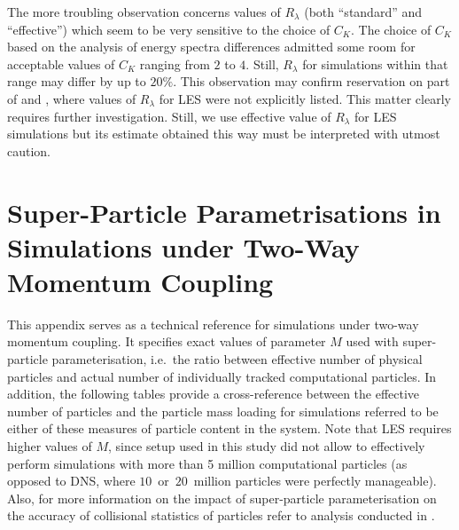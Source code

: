 \documentclass{pracamgren}
\begin{document}
The more troubling observation concerns values of $R_{\lambda}$ (both ``standard'' and ``effective'') which seem to be very sensitive to the choice of $C_K$.
The choice of $C_K$ based on the analysis of energy spectra differences admitted some room for acceptable values of $C_K$ ranging from $2$ to $4$.
Still, $R_{\lambda}$ for simulations within that range may differ by up to $20\%$.
This observation may confirm reservation on part of \textcite{Yang2008} and \textcite{Jin2010}, where values of $R_{\lambda}$ for LES were not explicitly listed.
This matter clearly requires further investigation.
Still, we use effective value of $R_{\lambda}$ for LES simulations but its estimate obtained this way must be interpreted with utmost caution.  



\chapter{Super-Particle Parametrisations in Simulations under Two-Way Momentum Coupling}
\label{app:spp}

This appendix serves as a technical reference for simulations under two-way momentum coupling.
It specifies exact values of parameter $M$ used with super-particle parameterisation, i.e.~the ratio between effective number of physical particles and actual number of individually tracked computational particles.
In addition, the following tables provide a cross-reference between the effective number of particles and the particle mass loading for simulations referred to be either of these measures of particle content in the system.
Note that LES requires higher values of $M$, since setup used in this study did not allow to effectively perform simulations with more than 5 million computational particles (as opposed to DNS, where $10$~or~$20$~million particles were perfectly manageable).
Also, for more information on the impact of super-particle parameterisation on the accuracy of collisional statistics of particles refer to analysis conducted in \textcite{Rosa2022}.  
\end{document}
